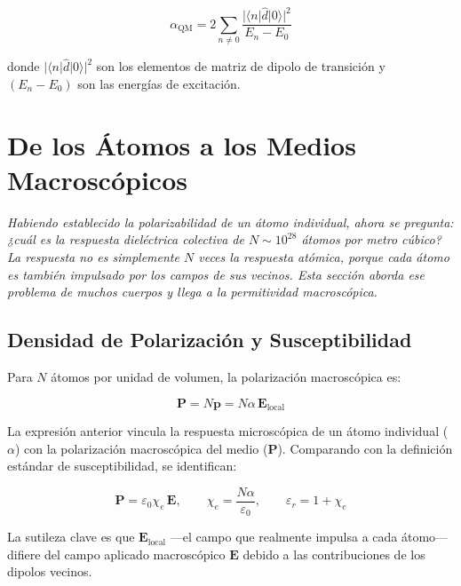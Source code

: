 \documentclass[12pt]{article}
\begin{document}
\begin{equation}
\alpha_{\text{QM}} =
2\sum_{n\neq 0}\frac{|\langle n|\hat{d}|0\rangle|^2}{E_n - E_0}
\end{equation}

donde $|\langle n|\hat{d}|0\rangle|^2$ son los elementos de matriz de dipolo de transici\'on y
$(E_n - E_0)$ son las energ\'ias de excitaci\'on.


\section{De los \'Atomos a los Medios Macrosc\'opicos}

\label{sec:macro_theory}


\noindent\textit{Habiendo establecido la polarizabilidad de un \'atomo individual, ahora se
pregunta: ¿cu\'al es la respuesta diel\'ectrica colectiva de $N \sim 10^{28}$ \'atomos por metro
c\'ubico? La respuesta no es simplemente $N$ veces la respuesta at\'omica, porque cada \'atomo
es tambi\'en impulsado por los campos de sus vecinos. Esta secci\'on aborda ese problema de
muchos cuerpos y llega a la permitividad macrosc\'opica.}

\subsection{Densidad de Polarizaci\'on y Susceptibilidad}

Para $N$ \'atomos por unidad de volumen, la polarizaci\'on macrosc\'opica es:

\begin{equation}
\mathbf{P} = N\mathbf{p} = N\alpha\,\mathbf{E}_{\text{local}}
\end{equation}

La expresi\'on anterior vincula la respuesta microsc\'opica de un \'atomo
individual ($\alpha$) con la polarizaci\'on macrosc\'opica del medio ($\mathbf{P}$).
Comparando con la definici\'on est\'andar de susceptibilidad, se identifican:

\begin{equation}
\mathbf{P} = \varepsilon_0\chi_e\,\mathbf{E}, \qquad
\chi_e = \frac{N\alpha}{\varepsilon_0}, \qquad
\varepsilon_r = 1 + \chi_e
\end{equation}

La sutileza clave es que $\mathbf{E}_{\text{local}}$ ---el campo que realmente impulsa a cada
\'atomo--- difiere del campo aplicado macrosc\'opico $\mathbf{E}$ debido a las
contribuciones de los dipolos vecinos.
\end{document}
